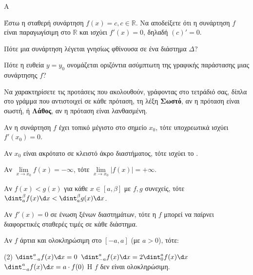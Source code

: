 \begin{thema}{A}
\begin{erwthma}
    \item Έστω η σταθερή συνάρτηση $ f(x)=c, c\in\mathbb{R} $. Να αποδείξετε ότι η συνάρτηση $ f $ είναι παραγωγίσιμη στο $ \mathbb{R} $ και ισχύει $ f'(x)=0 $, δηλαδή $ (c)'=0 $.
    \item Πότε μια συνάρτηση λέγεται γνησίως φθίνουσα σε ένα διάστημα $\Delta$?
    \item Πότε η ευθεία $y=y_0$ ονομάζεται οριζόντια ασύμπτωτη της γραφικής παράστασης μιας συνάρτησης $f$?
    \item Να χαρακτηρίσετε τις προτάσεις που ακολουθούν, γράφοντας στο τετράδιό σας, δίπλα στο γράμμα που αντιστοιχεί σε κάθε πρόταση, τη λέξη \textbf{Σωστό}, αν η πρόταση είναι σωστή, ή \textbf{Λάθος}, αν η πρόταση είναι λανθασμένη.
    \begin{alist}
        \item Αν η συνάρτηση $f$ έχει τοπικό μέγιστο στο σημείο $x_0$, τότε υποχρεωτικά ισχύει $f'(x_0) = 0$.
        \item Αν $x_0$ είναι ακρότατο σε κλειστό άκρο διαστήματος, τότε ισχύει το .
        \item Αν $\lim\limits_{x\to x_0} f(x) = -\infty$, τότε $\lim\limits_{x\to x_0} |f(x)| = +\infty$.
        \item Αν $f(x) < g(x)$ για κάθε $x \in [a, \beta]$ με $f,g$ συνεχείς, τότε $\dint_a^\beta f(x) \d x < \dint_a^\beta g(x) \d x$.
        \item Αν $f'(x) = 0$ σε ένωση ξένων διαστημάτων, τότε η $f$ μπορεί να παίρνει διαφορετικές σταθερές τιμές σε κάθε διάστημα.
    \end{alist}
    \item Αν $f$ άρτια και ολοκληρώσιμη στο $[-a, a]$ (με $a > 0$), τότε:
    \begin{tasks}[label=\let\textdexiakeraia\relax\alph*.](2)
        \task $\dint_{-a}^{a} f(x) \d x = 0$
        \task $\dint_{-a}^{a} f(x) \d x = 2\dint_0^{a} f(x) \d x$
        \task $\dint_{-a}^{a} f(x) \d x = a \cdot f(0)$
        \task H $f$ δεν είναι ολοκληρώσιμη.
    \end{tasks}
\end{erwthma}
\end{thema}


